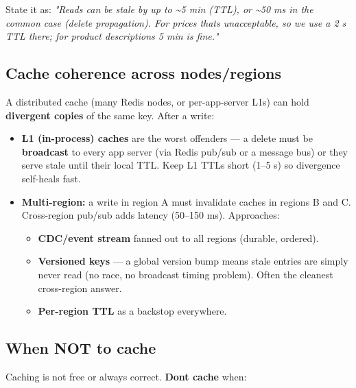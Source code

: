 \documentclass[11pt]{article}
\providecommand{\tightlist}{\setlength{\itemsep}{1pt}\setlength{\parskip}{0pt}}
\begin{document}
State it as: \emph{"Reads can be stale by up to \textasciitilde5 min (TTL), or \textasciitilde50 ms in the common case (delete propagation). For prices that\textquotesingle s unacceptable, so we use a 2 s TTL there; for product descriptions 5 min is fine."}

\subsection{Cache coherence across nodes/regions}\label{cache-coherence-across-nodesregions}

A distributed cache (many Redis nodes, or per-app-server L1s) can hold \textbf{divergent copies} of the same key. After a write:

\begin{itemize}
\tightlist
\item
  \textbf{L1 (in-process) caches} are the worst offenders --- a delete must be \textbf{broadcast} to every app server (via Redis pub/sub or a message bus) or they serve stale until their local TTL. Keep L1 TTLs short (1--5 s) so divergence self-heals fast.
\item
  \textbf{Multi-region:} a write in region A must invalidate caches in regions B and C. Cross-region pub/sub adds latency (50--150 ms). Approaches:

  \begin{itemize}
  \tightlist
  \item
    \textbf{CDC/event stream} fanned out to all regions (durable, ordered).
  \item
    \textbf{Versioned keys} --- a global version bump means stale entries are simply never read (no race, no broadcast timing problem). Often the cleanest cross-region answer.
  \item
    \textbf{Per-region TTL} as a backstop everywhere.
  \end{itemize}
\end{itemize}

\subsection{When NOT to cache}\label{when-not-to-cache}

Caching is not free or always correct. \textbf{Don\textquotesingle t cache} when:
\end{document}
